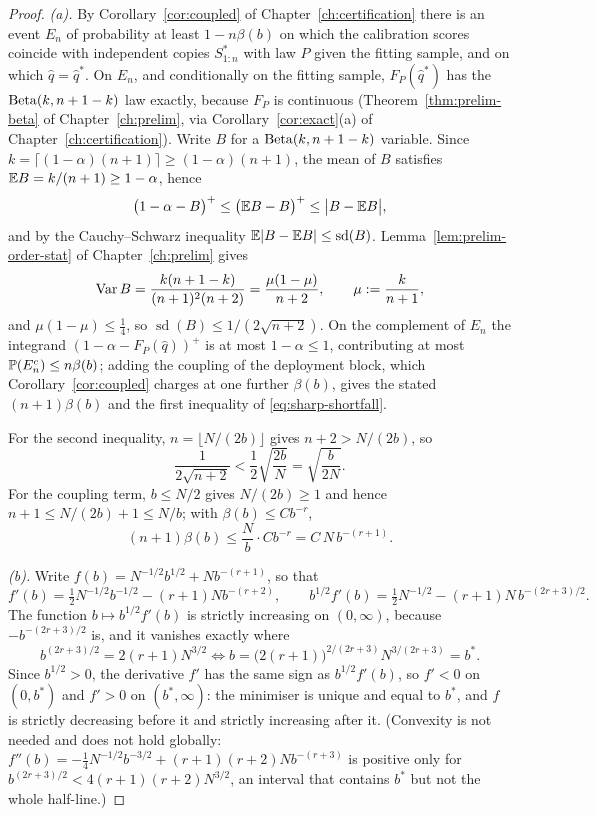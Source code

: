 \documentclass[../../../main.tex]{subfiles}
\begin{document}
\begin{proof}
\emph{(a).} By Corollary~\ref{cor:coupled} of Chapter~\ref{ch:certification} there is an event $E_n$ of probability at least $1-n\beta(b)$ on which the calibration scores coincide with independent copies $S^*_{1:n}$ with law $P$ given the fitting sample, and on which $\hat q=\hat q^*$. On $E_n$, and conditionally on the fitting sample, $F_P(\hat q^*)$ has the $\operatorname{Beta}(k,n+1-k)$ law exactly, because $F_P$ is continuous (Theorem~\ref{thm:prelim-beta} of Chapter~\ref{ch:prelim}, via Corollary~\ref{cor:exact}(a) of Chapter~\ref{ch:certification}). Write $B$ for a $\operatorname{Beta}(k,n+1-k)$ variable. Since $k=\lceil(1-\alpha)(n+1)\rceil\ge(1-\alpha)(n+1)$, the mean of $B$ satisfies $\mathbb{E} B=k/(n+1)\ge1-\alpha$, hence
\[
\big(1-\alpha-B\big)^+\le\big(\mathbb{E} B-B\big)^+\le\big|B-\mathbb{E} B\big| ,
\]
and by the Cauchy--Schwarz inequality $\mathbb{E}|B-\mathbb{E} B|\le\operatorname{sd}(B)$. Lemma~\ref{lem:prelim-order-stat} of Chapter~\ref{ch:prelim} gives
\[
\operatorname{Var} B=\frac{k(n+1-k)}{(n+1)^2(n+2)}=\frac{\mu(1-\mu)}{n+2},\qquad \mu:=\frac k{n+1},
\]
and $\mu(1-\mu)\le\tfrac14$, so $\operatorname{sd}(B)\le1/(2\sqrt{n+2})$. On the complement of $E_n$ the integrand $(1-\alpha-F_P(\hat q))^+$ is at most $1-\alpha\le1$, contributing at most $\mathbb{P}(E_n^c)\le n\beta(b)$; adding the coupling of the deployment block, which Corollary~\ref{cor:coupled} charges at one further $\beta(b)$, gives the stated $(n+1)\beta(b)$ and the first inequality of \eqref{eq:sharp-shortfall}.

For the second inequality, $n=\lfloor N/(2b)\rfloor$ gives $n+2>N/(2b)$, so
\[
\frac1{2\sqrt{n+2}}<\frac12\sqrt{\frac{2b}N}=\sqrt{\frac b{2N}} .
\]
For the coupling term, $b\le N/2$ gives $N/(2b)\ge1$ and hence $n+1\le N/(2b)+1\le N/b$; with $\beta(b)\le Cb^{-r}$,
\[
(n+1)\beta(b)\le\frac Nb\cdot Cb^{-r}=C\,N\,b^{-(r+1)} .
\]

\emph{(b).} Write $f(b)=N^{-1/2}b^{1/2}+Nb^{-(r+1)}$, so that
\[
f'(b)=\tfrac12N^{-1/2}b^{-1/2}-(r+1)Nb^{-(r+2)},\qquad
b^{1/2}f'(b)=\tfrac12N^{-1/2}-(r+1)N\,b^{-(2r+3)/2} .
\]
The function $b\mapsto b^{1/2}f'(b)$ is strictly increasing on $(0,\infty)$, because $-b^{-(2r+3)/2}$ is, and it vanishes exactly where
\[
b^{(2r+3)/2}=2(r+1)N^{3/2}\iff b=\big(2(r+1)\big)^{2/(2r+3)}N^{3/(2r+3)}=b^* .
\]
Since $b^{1/2}>0$, the derivative $f'$ has the same sign as $b^{1/2}f'(b)$, so $f'<0$ on $(0,b^*)$ and $f'>0$ on $(b^*,\infty)$: the minimiser is unique and equal to $b^*$, and $f$ is strictly decreasing before it and strictly increasing after it. (Convexity is not needed and does not hold globally: $f''(b)=-\tfrac14N^{-1/2}b^{-3/2}+(r+1)(r+2)Nb^{-(r+3)}$ is positive only for $b^{(2r+3)/2}<4(r+1)(r+2)N^{3/2}$, an interval that contains $b^*$ but not the whole half-line.)


\end{proof}
\end{document}
